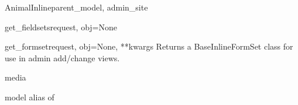 \documentclass[letterpaper,10pt,english]{sphinxmanual}
\begin{document}
\begin{classdesc}{AnimalInline}{parent\_model, admin\_site}
\hypertarget{animal.admin.AnimalInline.get_fieldsets}{}\begin{methoddesc}{get\_fieldsets}{request, obj=None}\end{methoddesc}

\hypertarget{animal.admin.AnimalInline.get_formset}{}\begin{methoddesc}{get\_formset}{request, obj=None, **kwargs}
Returns a BaseInlineFormSet class for use in admin add/change views.
\end{methoddesc}

\hypertarget{animal.admin.AnimalInline.media}{}\begin{memberdesc}{media}\end{memberdesc}

\hypertarget{animal.admin.AnimalInline.model}{}\begin{memberdesc}{model}
alias of 
\end{memberdesc}
\end{classdesc}
\end{document}
